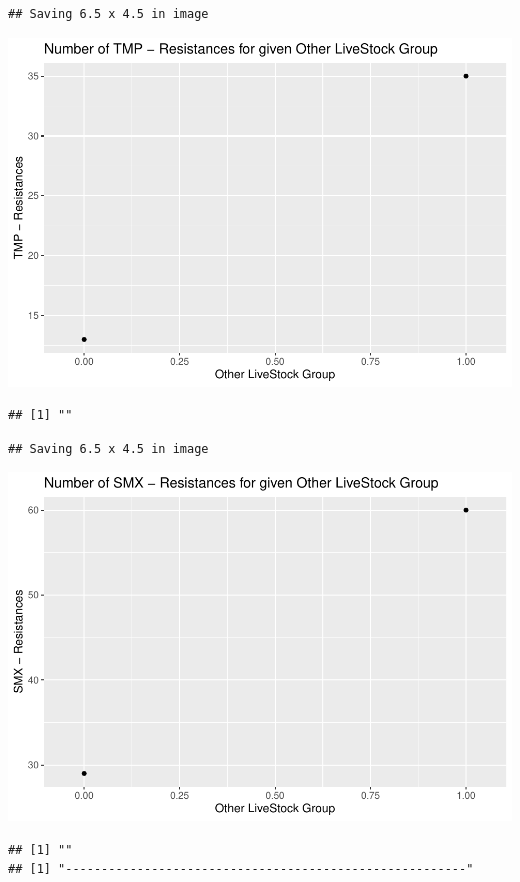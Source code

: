 \documentclass[
]{article}
\begin{document}
\begin{verbatim}
## Saving 6.5 x 4.5 in image
\end{verbatim}

\includegraphics{NResistenzen_files/figure-latex/binary_or_nominal_variables-19.pdf}

\begin{verbatim}
## [1] ""
\end{verbatim}

\begin{verbatim}
## Saving 6.5 x 4.5 in image
\end{verbatim}

\includegraphics{NResistenzen_files/figure-latex/binary_or_nominal_variables-20.pdf}

\begin{verbatim}
## [1] ""
## [1] "--------------------------------------------------------"
\end{verbatim}
\end{document}
